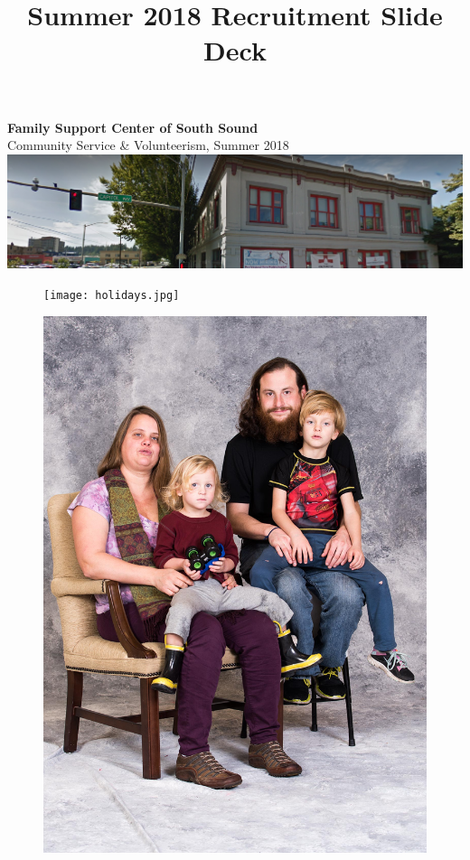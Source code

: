 \documentclass{beamer}
\title{Summer 2018 Recruitment Slide Deck}
\begin{document}
\begin{frame}
  \textbf{\LARGE Family Support Center of South Sound}\\
  {\Large Community Service \& Volunteerism, Summer 2018}\\
  \includegraphics[width=\textwidth]{main-office.png}
\end{frame}

\begin{frame}
  \begin{figure}
  \centering
    \begin{minipage}{0.49\textwidth}
    \centering
    \texttt{[image: holidays.jpg]} 
    \end{minipage}\hfill
    \begin{minipage}{0.49\textwidth}
    \centering
    \includegraphics[width=\textwidth]{portrait-family.jpg}
    \end{minipage}
  \end{figure}
\end{frame}
\end{document}
